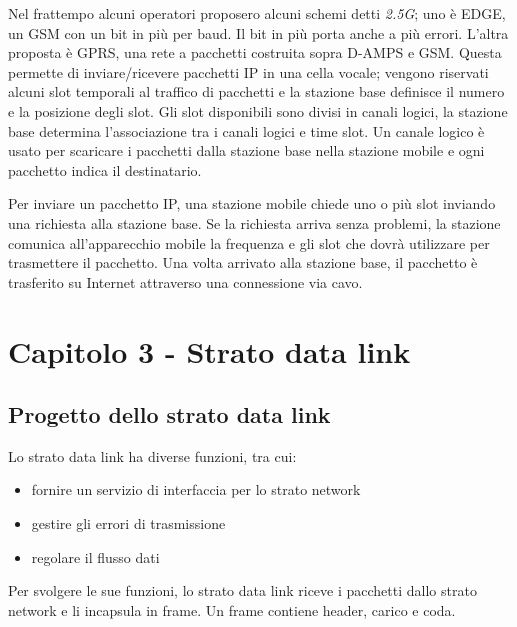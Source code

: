Nel frattempo alcuni operatori proposero alcuni schemi detti \textit{2.5G}; 
uno è EDGE, un GSM con un bit in più per baud. Il bit in più porta anche a più errori.
L'altra proposta è GPRS, una rete a pacchetti costruita sopra D-AMPS e GSM.
Questa permette di inviare/ricevere pacchetti IP in una cella vocale;
vengono riservati alcuni slot temporali al traffico di pacchetti e la stazione base definisce il numero e la posizione degli slot.
Gli slot disponibili sono divisi in canali logici, la stazione base determina l'associazione tra i canali logici e time slot.
Un canale logico è usato per scaricare i pacchetti dalla stazione base nella stazione mobile e ogni pacchetto indica il destinatario.

Per inviare un pacchetto IP, una stazione mobile chiede uno o più slot inviando una richiesta alla stazione base.
Se la richiesta arriva senza problemi, la stazione comunica all'apparecchio mobile la frequenza e gli slot che dovrà utilizzare per trasmettere il pacchetto.
Una volta arrivato alla stazione base, il pacchetto è trasferito su Internet attraverso una connessione via cavo.

\newpage
\section{Capitolo 3 - Strato data link}

\subsection{Progetto dello strato data link} %
Lo strato data link ha diverse funzioni, tra cui:
\begin{itemize}
    \item fornire un servizio di interfaccia per lo strato network
    \item gestire gli errori di trasmissione
    \item regolare il flusso dati 
\end{itemize}
Per svolgere le sue funzioni, lo strato data link riceve i pacchetti dallo strato network e li incapsula in frame.
Un frame contiene header, carico e coda.

